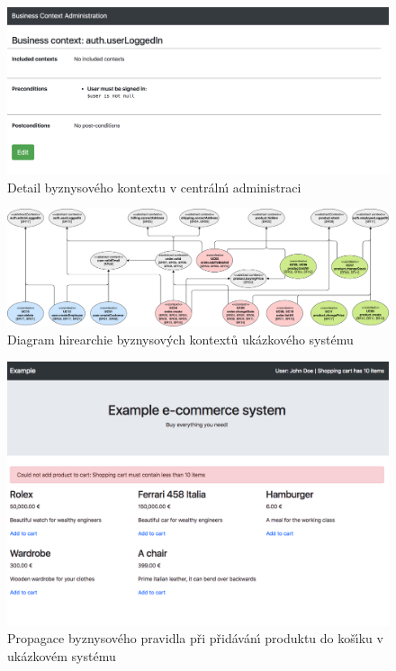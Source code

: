 \begin{figure}
    \centering
    \includegraphics[width=0.9\linewidth]{figures/business-context-detail.png}
    \caption{Detail byznysového kontextu v centráln\'{\i} administraci}
    \label{fig:screenshot-context-detail}
\end{figure}

\begin{figure}
    \centering
    \includegraphics[keepaspectratio=true, width=\linewidth]{figures/example-system-context-hierarchy.pdf}
    \caption{Diagram hirearchie byznysov\'ych kontextů ukázkového systému}
    \label{fig:example-system-context-hirearchy}
\end{figure}

\begin{figure}
    \centering
    \includegraphics[width=0.9\linewidth]{figures/add-product-to-cart-fail.png}
    \caption{Propagace byznysového pravidla při přidáván\'{\i} produktu do koš\'{\i}ku v ukázkovém systému}
    \label{fig:example-screenshot}
\end{figure}

